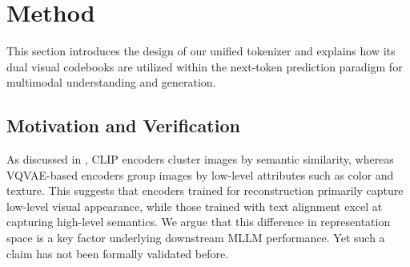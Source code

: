 \section{Method}
\label{method}

This section introduces the design of our unified tokenizer and explains how its dual visual codebooks are utilized within the next-token prediction paradigm for multimodal understanding and generation.

\subsection{Motivation and Verification}
\label{sec:motivation}

\begin{minipage}[t]{0.389\textwidth}
    As discussed in \citet{qu2024tokenflow}, CLIP encoders cluster images by semantic similarity, whereas VQVAE-based encoders group images by low-level attributes such as color and texture. This suggests that encoders trained for reconstruction primarily capture low-level visual appearance, while those trained with text alignment excel at capturing high-level semantics. We argue that this difference in representation space is a key factor underlying downstream MLLM performance. Yet such a claim has not been formally validated before.
\end{minipage}
\hfill
\begin{minipage}[t]{0.598\textwidth}
\vspace{-0.25cm}
    \centering
    \captionsetup{type=table}
    \caption{
        \textbf{Downstream visual understanding performance with different vision encoders within the LLaVA-1.5 framework.} The \textit{CLIP-based} encoder corresponds to the siglip-so400m-14-384 model~\citep{alabdulmohsin2023so400m}, whereas \textit{CLIP-based (recon.)} denotes an encoder with the same architecture but trained solely for reconstruction from scratch, controlling for factors like model size and architecture. For the \textit{VQVAE-based} encoder, we adopt SBER-MoVQGAN-270M, a well-established reconstruction model.
    }
    \label{tab:validation}
    \vspace{-0.1cm}
\end{minipage}

